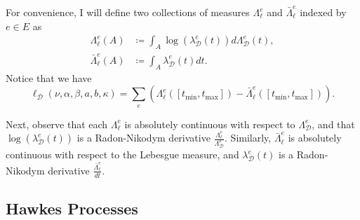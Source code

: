 \documentclass[honours,12pt]{unswthesis}
\numberwithin{equation}{section}
\begin{document}
For convenience, I will define two collections of measures $\Lambda_\ell^e$ and $\bar\Lambda_\ell^e$ indexed by $e\in E$ as
\begin{equation*}
	\begin{align}
		\Lambda_\ell^e(A) &\coloneq \int_A \log(\lambda_\mathcal{D}^e(t)) d\Lambda_\mathcal{D}^e(t), \\
		\bar\Lambda_\ell^e(A) &\coloneq \int_A \lambda_\mathcal{D}^e(t) dt.
	\end{align}
\end{equation*}
Notice that we have
$$\ell_\mathcal{D}(\nu,\alpha,\beta,a,b,\kappa) = \sum_e \left(\Lambda_\ell^e([t_\mathrm{min},t_\mathrm{max}]) - \bar\Lambda_\ell^e([t_\mathrm{min},t_\mathrm{max}])\right).$$

Next, observe that each $\Lambda_\ell^e$ is absolutely continuous with respect to $\Lambda_\mathcal{D}^e$, and that $\log(\lambda_\mathcal{D}^e(t))$ is a Radon-Nikodym derivative $\frac{\Lambda_\ell^e}{\Lambda_\mathcal{D}^e}$. Similarly, $\bar\Lambda_\ell^e$ is absolutely continuous with respect to the Lebesgue measure, and $\lambda_\mathcal{D}^e(t)$ is a Radon-Nikodym derivative $\frac{\bar\Lambda_\ell^e}{dt}$.

\subsection{Hawkes Processes}
\end{document}
